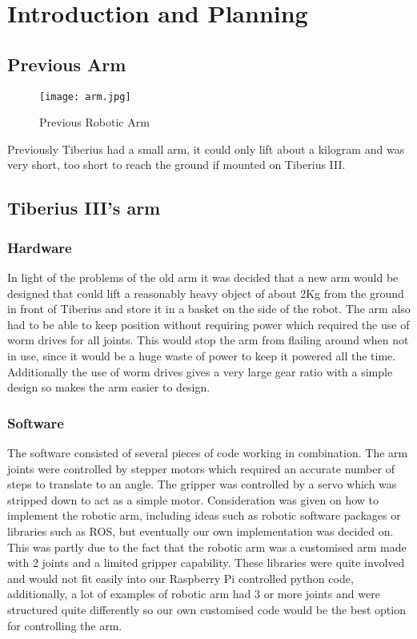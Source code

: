 \section{Introduction and Planning}
\subsection{Previous Arm}

\begin{figure}[!htb]
\begin{center}
\texttt{[image: arm.jpg]}
\end{center}
\caption{Previous Robotic Arm}
\label{fig:arm}
\end{figure}
\noindent
Previously Tiberius had a small arm, it could only lift about a kilogram and was very short, too short to reach the ground if mounted on Tiberius III.  
\subsection{Tiberius III's arm}
\subsubsection{Hardware}
In light of the problems of the old arm it was decided that a new arm would be designed that could lift a reasonably heavy object of about 2Kg from the ground in front of Tiberius and store it in a basket on the side of the robot.
\newline
The arm also had to be able to keep position without requiring power which required the use of worm drives for all joints. This would stop the arm from flailing around when not in use, since it would be a huge waste of power to keep it powered all the time. Additionally the use of worm drives gives a very large gear ratio with a simple design so makes the arm easier to design.

\subsubsection{Software}
The software consisted of several pieces of code working in combination.  The arm joints were controlled by stepper motors which required an accurate number of steps to translate to an angle.
The gripper was controlled by a servo which was stripped down to act as a simple motor.  
\newline
Consideration was given on how to implement the robotic arm, including ideas such as robotic software packages or libraries such as ROS, but eventually our own implementation was decided on.  This was partly due to the fact that the robotic arm was a customised arm made with 2 joints and a limited gripper capability.  These libraries were quite involved and would not fit easily into our Raspberry Pi controlled python code, additionally, a lot of examples of robotic arm had 3 or more joints and were structured quite differently so our own customised code would be the best option for controlling the arm.


